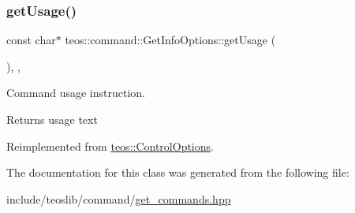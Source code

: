 \subsubsection{\texorpdfstring{get\+Usage()}{getUsage()}}
{\footnotesize\ttfamily const char$\ast$ teos\+::command\+::\+Get\+Info\+Options\+::get\+Usage (\begin{DoxyParamCaption}{ }\end{DoxyParamCaption})\hspace{0.3cm}{\ttfamily [inline]}, {\ttfamily [protected]}, {\ttfamily [virtual]}}



Command \textquotesingle{}usage\textquotesingle{} instruction. 

\begin{DoxyReturn}{Returns}
usage text 
\end{DoxyReturn}


Reimplemented from \mbox{\hyperlink{classteos_1_1_control_options_a0aa5671f9bc750ed5280c26c543874f3}{teos\+::\+Control\+Options}}.



The documentation for this class was generated from the following file\+:\begin{DoxyCompactItemize}
\item 
include/teoslib/command/\mbox{\hyperlink{get__commands_8hpp}{get\+\_\+commands.\+hpp}}\end{DoxyCompactItemize}
